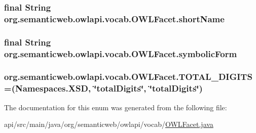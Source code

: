 \hypertarget{enumorg_1_1semanticweb_1_1owlapi_1_1vocab_1_1_o_w_l_facet_a11866bbbe812f44e207fabbf8caa75b8}{
\subsubsection[{short\-Name}]{\setlength{\rightskip}{0pt plus 5cm}final String org.\-semanticweb.\-owlapi.\-vocab.\-O\-W\-L\-Facet.\-short\-Name\hspace{0.3cm}{\ttfamily [private]}}}\label{enumorg_1_1semanticweb_1_1owlapi_1_1vocab_1_1_o_w_l_facet_a11866bbbe812f44e207fabbf8caa75b8}
\hypertarget{enumorg_1_1semanticweb_1_1owlapi_1_1vocab_1_1_o_w_l_facet_a99a2d7c0adde6f2bf6b87fdf7c66e20e}{
\subsubsection[{symbolic\-Form}]{\setlength{\rightskip}{0pt plus 5cm}final String org.\-semanticweb.\-owlapi.\-vocab.\-O\-W\-L\-Facet.\-symbolic\-Form\hspace{0.3cm}{\ttfamily [private]}}}\label{enumorg_1_1semanticweb_1_1owlapi_1_1vocab_1_1_o_w_l_facet_a99a2d7c0adde6f2bf6b87fdf7c66e20e}
\hypertarget{enumorg_1_1semanticweb_1_1owlapi_1_1vocab_1_1_o_w_l_facet_a32dea2032eeb9880d49454392328a731}{
\subsubsection[{T\-O\-T\-A\-L\-\_\-\-D\-I\-G\-I\-T\-S}]{\setlength{\rightskip}{0pt plus 5cm}org.\-semanticweb.\-owlapi.\-vocab.\-O\-W\-L\-Facet.\-T\-O\-T\-A\-L\-\_\-\-D\-I\-G\-I\-T\-S =({\bf Namespaces.\-X\-S\-D}, \char`\"{}total\-Digits\char`\"{}, \char`\"{}total\-Digits\char`\"{})}}\label{enumorg_1_1semanticweb_1_1owlapi_1_1vocab_1_1_o_w_l_facet_a32dea2032eeb9880d49454392328a731}


The documentation for this enum was generated from the following file\-:\begin{DoxyCompactItemize}
\item 
api/src/main/java/org/semanticweb/owlapi/vocab/\hyperlink{_o_w_l_facet_8java}{O\-W\-L\-Facet.\-java}\end{DoxyCompactItemize}
